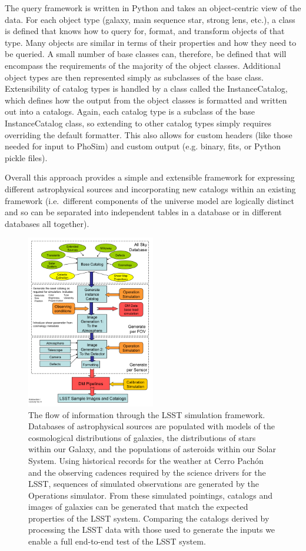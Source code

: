 \documentclass[11pt]{article}
\begin{document}
The query framework is written in Python and takes an object-centric
view of the data.  For each object type (galaxy, main sequence star,
strong lens, etc.), a class is defined that knows how to query for,
format, and transform objects of that type.  Many objects are similar
in terms of their properties and how they need to be queried.  A small
number of base classes can, therefore, be defined that will encompass
the requirements of the majority of the object classes.  Additional
object types are then represented simply as subclasses of the base
class. Extensibility of catalog types is handled by a class called the
InstanceCatalog, which defines how the output from the object classes
is formatted and written out into a catalogs.  Again, each catalog
type is a subclass of the base InstanceCatalog class, so extending to
other catalog types simply requires overriding the default formatter.
This also allows for custom headers (like those needed for input to
PhoSim) and custom output (e.g. binary, fits, or Python pickle files).

Overall this approach provides a simple and extensible framework for
expressing different astrophysical sources and incorporating new
catalogs within an existing framework (i.e.\ different components of
the universe model are logically distinct and so can be separated into
independent tables in a database or in different databases all
together).

\begin{figure}[h]
\centerline{\includegraphics[width=0.5\textwidth]{validation_figures/flow.png}}
\caption{The flow of information through the LSST simulation
 framework. Databases of astrophysical sources are populated with
 models of the cosmological distributions of galaxies, the
 distributions of stars within our Galaxy, and the populations of
 asteroids within our Solar System. Using historical records for the
 weather at Cerro Pach\'{o}n and the observing cadences required by the
 science drivers for the LSST, sequences of simulated observations
 are generated by the Operations simulator. From these simulated
 pointings, catalogs and images of galaxies can be generated that
 match the expected properties of the LSST system. Comparing the
 catalogs derived by processing the LSST data with those used to
 generate the inputs we enable a full end-to-end test of the LSST
 system.}
\label{fig:flow}       %
\end{figure}
\end{document}
